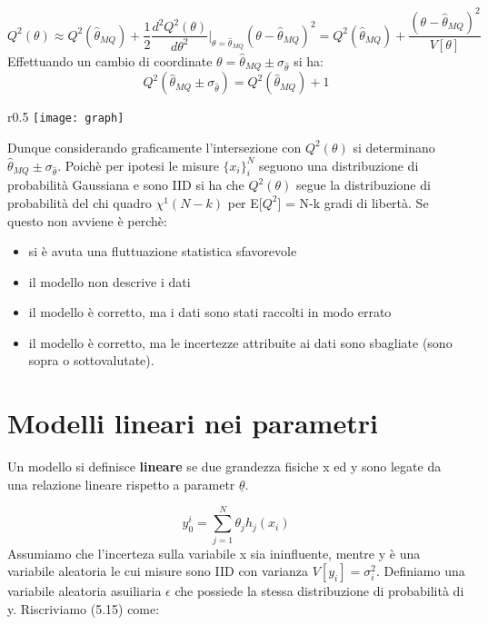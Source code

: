 \documentclass[11pt,a4paper]{book}
\begin{document}
\begin{equation*}
	Q^2(\theta) \approx Q^2(\hat{\theta}_{MQ}) + \dfrac{1}{2}\dfrac{d^2 Q^2(\theta)}{d\theta^2}\Big \vert_{\theta = \hat{\theta}_{MQ}}(\theta - \hat{\theta}_{MQ})^2 = Q^2(\hat{\theta}_{MQ}) + \dfrac{(\theta - \hat{\theta}_{MQ})^2}{V[\theta]}
\end{equation*}
Effettuando un cambio di coordinate $\theta = \hat{\theta}_{MQ} \pm \sigma_{\hat{\theta}}$ si ha:
\begin{equation*}
	Q^2(\hat{\theta}_{MQ} \pm \sigma_{\hat{\theta}}) = Q^2(\hat{\theta}_{MQ}) + 1
\end{equation*}
\begin{wrapfigure}[8]{r}{0.5 \textwidth}
\centering
\texttt{[image: graph]}	
\end{wrapfigure}
\newline
Dunque considerando graficamente l'intersezione con $Q^2(\theta)$ si determinano $\hat{\theta}_{MQ} \pm \sigma_{\hat{\theta}}$. Poich\`{e} per ipotesi le misure $\{x_i\}_i^N$ seguono una distribuzione di probabilit\`{a} Gaussiana e sono IID si ha che $Q^2(\theta)$ segue la distribuzione di probabilit\`{a} del chi quadro $\chi^1(N-k)$ per E[$Q^2$] = N-k gradi di libert\`{a}. Se questo non avviene \`{e} perch\`{e}:
\begin{itemize}
	\item si \`{e} avuta una fluttuazione statistica sfavorevole
	\item il modello non descrive i dati
	\item il modello \`{e} corretto, ma i dati sono stati raccolti in modo errato
	\item il modello \`{e} corretto, ma le incertezze attribuite ai dati sono sbagliate (sono sopra o sottovalutate).
\end{itemize}

\section{Modelli lineari nei parametri}

Un modello si definisce \textbf{lineare} se due grandezza fisiche x ed y sono legate da una relazione lineare rispetto a parametr $\underline{\theta}$.

\begin{equation}
	y_{0}^{i} = \sum_{j = 1}^N \theta_{j}h_{j}(x_i)
\end{equation}
Assumiamo che l'incerteza sulla variabile x sia ininfluente, mentre y \`{e} una variabile aleatoria le cui misure sono IID con varianza $V[y_i] = \sigma_i^2$. Definiamo una variabile aleatoria asuiliaria $\epsilon$ che possiede la stessa distribuzione di probabilit\`{a} di y. Riscriviamo (5.15) come:
\end{document}
